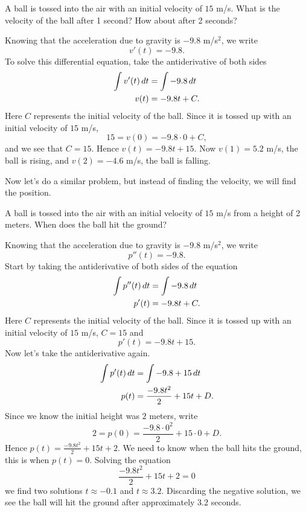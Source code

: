 \begin{example}
A ball is tossed into the air with an initial velocity of $15$
m/s. What is the velocity of the ball after 1 second? How about after
2 seconds?
\end{example}

\begin{solution}
Knowing that the acceleration due to gravity is $-9.8$ m/s$^2$, we write
\[
v'(t) = -9.8.
\]
To solve this differential equation, take the antiderivative of both sides
\begin{align*}
\int v'(t) \, d t &= \int -9.8 \, d t\\
v(t) &= -9.8t + C.
\end{align*}
Here $C$ represents the initial velocity of the ball. Since it is
tossed up with an initial velocity of $15$ m/s, 
\[
15 = v(0) = -9.8\cdot 0 + C,
\]
and we see that $C=15$. Hence $v(t) = -9.8t + 15$. Now $v(1) = 5.2$
m/s, the ball is rising, and $v(2) = -4.6$ m/s, the ball is falling.
\end{solution}

Now let's do a similar problem, but instead of finding the velocity,
we will find the position.

\begin{example}
A ball is tossed into the air with an initial velocity of $15$ m/s
from a height of 2 meters. When does the ball hit the ground?
\end{example}

\begin{solution}
Knowing that the acceleration due to gravity is $-9.8$ m/s$^2$, we write
\[
p''(t) = -9.8.
\]
Start by taking the antiderivative of both sides of the equation
\begin{align*}
\int p''(t) \, d t &= \int -9.8 \, d t\\
p'(t) &= -9.8t + C.
\end{align*}
Here $C$ represents the initial velocity of the ball. Since it is
tossed up with an initial velocity of $15$ m/s, $C = 15$ and 
\[
p'(t) = -9.8t + 15.
\]
Now let's take the antiderivative again. 
\begin{align*}
\int p'(t) \, d t &= \int -9.8 +15\, d t\\
p(t) &= \frac{-9.8t^2}{2} + 15t + D.
\end{align*}
Since we know the initial height was $2$ meters, write
\[
2 = p(0) =  \frac{-9.8\cdot 0^2}{2} + 15\cdot 0 + D.
\]
Hence $p(t) = \frac{-9.8t^2}{2} + 15t + 2$. We need to know when the
ball hits the ground, this is when $p(t)=0$. Solving the equation
\[
\frac{-9.8t^2}{2} + 15t + 2 = 0
\]
we find two solutions $t\approx -0.1$ and $t\approx 3.2$. Discarding
the negative solution, we see the ball will hit the ground after
approximately $3.2$ seconds.
\end{solution}


